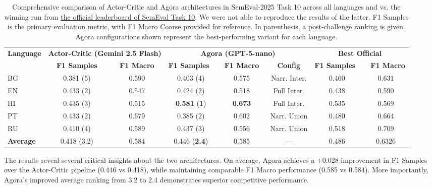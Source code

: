 \begin{table*}[ht]
\centering
\caption{Comprehensive comparison of Actor-Critic and Agora architectures in SemEval-2025 Task 10 across all languages and vs. the winning run from \href{https://propaganda.math.unipd.it/semeval2025task10/leaderboardv3.html}{the official leaderboard of SemEval Task 10}. We were not able to reproduce the results of the latter. F1 Samples is the primary evaluation metric, with F1 Macro Coarse provided for reference. In parenthesis, a post-challenge ranking is given. Agora configurations shown represent the best-performing variant for each language.}
\label{tab:semeval_comprehensive}
\small
\begin{tabular}{lc@{}cc@{}c@{}cc@{}c}
\hline
\textbf{Language} & \multicolumn{2}{c}{\textbf{Actor-Critic (Gemini 2.5 Flash)}} & \multicolumn{3}{c}{\textbf{Agora (GPT-5-nano)}} &  \multicolumn{2}{c}{\textbf{Best Official}}\\
\cline{2-3} \cline{4-6} \cline{7-8}
& \textbf{F1 Samples} & \textbf{F1 Macro} & \textbf{F1 Samples~} & \textbf{~F1 Macro~} & \textbf{Config} & \textbf{F1 Samples~} & \textbf{~F1 Macro}\\
\hline
BG & 0.381 (5) & 0.590 & 0.403 (4) & 0.575 & Narr. Inter. & 0.460 & 0.631\\
EN & 0.433 (2) & 0.547 & 0.424 (2) & 0.518 & Full Inter. & 0.438  & 0.590\\
HI & 0.435 (3) & 0.515  & \textbf{0.581} (\textbf{1}) & \textbf{0.673} & Full Inter.  & 0.535 & 0.569\\
PT & 0.433 (2) & 0.679  & 0.385 (2) & 0.602 & Narr. Union   & 0.480  & 0.664\\
RU & 0.410 (4) & 0.589 &  0.437 (3) & 0.556 & Narr. Union   & 0.518 & 0.709\\
\hline
\textbf{Average} & 0.418 (3.2) & 0.584 & 0.446 (\textbf{2.4}) & 0.585 & ---& 0.486 & 0.6326\\
\hline
\end{tabular}
\end{table*}


The results reveal several critical insights about the two architectures. On average, Agora achieves a +0.028 improvement in F1 Samples over the Actor-Critic pipeline (0.446 vs 0.418), while maintaining comparable F1 Macro performance (0.585 vs 0.584). More importantly, Agora's improved average ranking from 3.2 to 2.4 demonstrates superior competitive performance.

